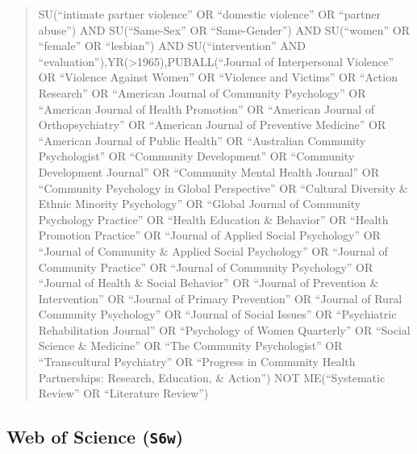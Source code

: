 \documentclass[]{tufte-handout}
\begin{document}
\begin{quote}
SU(``intimate partner violence'' OR ``domestic violence'' OR ``partner
abuse'') AND SU(``Same-Sex'' OR ``Same-Gender'') AND SU(``women'' OR
``female'' OR ``lesbian'') AND SU(``intervention'' AND
``evaluation''),YR(\textgreater{}1965),PUBALL(``Journal of Interpersonal
Violence'' OR ``Violence Against Women'' OR ``Violence and Victims'' OR
``Action Research'' OR ``American Journal of Community Psychology'' OR
``American Journal of Health Promotion'' OR ``American Journal of
Orthopsychiatry'' OR ``American Journal of Preventive Medicine'' OR
``American Journal of Public Health'' OR ``Australian Community
Psychologist'' OR ``Community Development'' OR ``Community Development
Journal'' OR ``Community Mental Health Journal'' OR ``Community
Psychology in Global Perspective'' OR ``Cultural Diversity \& Ethnic
Minority Psychology'' OR ``Global Journal of Community Psychology
Practice'' OR ``Health Education \& Behavior'' OR ``Health Promotion
Practice'' OR ``Journal of Applied Social Psychology'' OR ``Journal of
Community \& Applied Social Psychology'' OR ``Journal of Community
Practice'' OR ``Journal of Community Psychology'' OR ``Journal of Health
\& Social Behavior'' OR ``Journal of Prevention \& Intervention'' OR
``Journal of Primary Prevention'' OR ``Journal of Rural Community
Psychology'' OR ``Journal of Social Issues'' OR ``Psychiatric
Rehabilitation Journal'' OR ``Psychology of Women Quarterly'' OR
``Social Science \& Medicine'' OR ``The Community Psychologist'' OR
``Transcultural Psychiatry'' OR ``Progress in Community Health
Partnerships: Research, Education, \& Action'') NOT ME(``Systematic
Review'' OR ``Literature Review'')
\end{quote}

\subsection{\texorpdfstring{Web of Science
(\texttt{S6w})}{Web of Science (S6w)}}\label{web-of-science-s6w}
\end{document}
